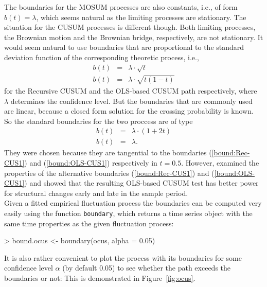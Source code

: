 \documentclass[10pt,a4paper]{article}
\begin{document}
The boundaries for the MOSUM processes are also constants, i.e., of form $b(t) =
\lambda$, which seems natural as the limiting processes are stationary. The
situation for the CUSUM processes is different though. Both limiting processes,
the Brownian motion and the Brownian bridge, respectively, are not stationary.
It would seem natural to use boundaries that are proportional to the standard
deviation function of the corresponding theoretic process, i.e.,
\begin{eqnarray}
\label{bound:Rec-CUS1} b(t) &=& \lambda \cdot \sqrt{t}\\
\label{bound:OLS-CUS1} b(t) &=& \lambda \cdot \sqrt{t(1-t)}
\end{eqnarray}
for the Recursive CUSUM and the OLS-based CUSUM path respectively,
where $\lambda$ determines the confidence level. But the
boundaries that are commonly used are linear, because a closed form solution for
the crossing probability is known. So the standard boundaries for the
two proccess are of type
\begin{eqnarray}
\label{bound:Rec-CUS} b(t) &=& \lambda \cdot (1+2t)\\
\label{bound:OLS-CUS} b(t) &=& \lambda.
\end{eqnarray}
They were chosen because they are tangential to the boundaries
(\ref{bound:Rec-CUS1}) and (\ref{bound:OLS-CUS1}) respectively in $t = 0.5$.
However, \cite{Zo:Zeileis:2000a} examined the properties of the alternative
boundaries (\ref{bound:Rec-CUS1}) and (\ref{bound:OLS-CUS1}) and showed that
the resulting OLS-based CUSUM test has better power
for structural changes early and late in the sample period.\\

Given a fitted empirical fluctuation process the boundaries can be
computed very easily using the function {\tt boundary}, which returns a time
series object with the same time properties as the given fluctuation process:
\begin{Schunk}
\begin{Sinput}
> bound.ocus <- boundary(ocus, alpha = 0.05)
\end{Sinput}
\end{Schunk}
It is also rather convenient to plot the process with its boundaries for some
confidence level $\alpha$ (by default 0.05) to see whether the path exceeds the
boundaries or not: This is demonstrated in Figure~\ref{fig:ocus}.
\end{document}
